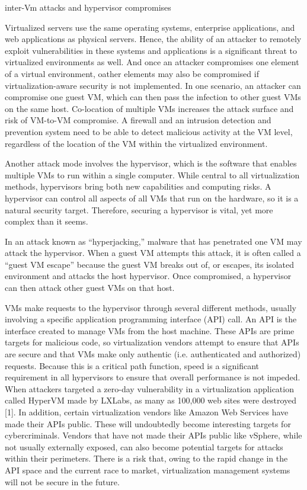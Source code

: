 inter-Vm attacks and hypervisor compromises

Virtualized servers use the same operating systems, enterprise applications, and web applications as physical servers. Hence, the ability of an attacker to remotely exploit vulnerabilities in these systems and applications is a significant threat to virtualized environments as well. And once an attacker compromises one element of a virtual environment, oather elements may also be compromised if virtualization-aware security is not implemented.
In one scenario, an attacker can compromise one guest VM, which can then pass
the infection to other guest VMs on the same host. Co-location of multiple VMs
increases the attack surface and risk of VM-to-VM compromise. A firewall and an intrusion detection and prevention system need to be able to detect malicious activity at the VM level, regardless of the location of the VM within the virtualized environment.

Another attack mode involves the hypervisor, which is the software that enables multiple VMs to run within a single computer. While central to all virtualization methods, hypervisors bring both new capabilities and computing risks. A hypervisor can control all aspects of all VMs that run on the hardware, so it is a natural security target. Therefore, securing a hypervisor is vital, yet more complex than it seems.

In an attack known as “hyperjacking,” malware that has penetrated one VM may attack the hypervisor. When a guest VM attempts this attack, it is often called a “guest VM escape” because the guest VM breaks out of, or escapes, its isolated environment and attacks the host hypervisor. Once compromised, a hypervisor can then attack other guest VMs on that host.

VMs make requests to the hypervisor through several different methods, usually involving a specific application programming interface (API) call. An API is the interface created to manage VMs from the host machine. These APIs are prime targets for malicious code, so virtualization vendors attempt to ensure that APIs are secure and that VMs make only authentic (i.e. authenticated and authorized) requests. Because this is a critical path function, speed is a significant requirement in all hypervisors to ensure that overall performance is not impeded.
When attackers targeted a zero-day vulnerability in a virtualization application called HyperVM made by LXLabs, as many as 100,000 web sites were destroyed [1]. In addition, certain virtualization vendors like Amazon Web Services have made their APIs public. These will undoubtedly become interesting targets for cybercriminals. Vendors that have not made their APIs public like vSphere, while not usually externally exposed, can also become potential targets for attacks within their perimeters. There is a risk that, owing to the rapid change in the API space and the current race to market, virtualization management systems will not be secure in the future.

